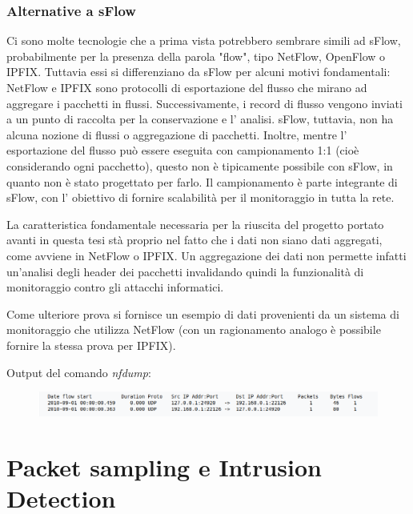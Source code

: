 \documentclass[12pt,a4paper,openright,twoside]{report}
\begin{document}
\subsubsection{Alternative a sFlow}

Ci sono molte tecnologie che a prima vista potrebbero sembrare simili ad sFlow,
probabilmente per la presenza della parola "flow", tipo NetFlow, OpenFlow o IPFIX.
Tuttavia essi si differenziano da sFlow per alcuni motivi fondamentali:
NetFlow e IPFIX sono protocolli di esportazione del flusso che mirano ad aggregare i pacchetti in flussi.
Successivamente, i record di flusso vengono inviati a un punto di raccolta per la
conservazione e l' analisi. \cite{S1} sFlow, tuttavia, non ha alcuna nozione di flussi o
aggregazione di pacchetti.
Inoltre, mentre l' esportazione del flusso pu\`o essere eseguita con campionamento 1:1
(cio\`e considerando ogni pacchetto), questo non \`e tipicamente possibile con sFlow,
in quanto non \`e stato progettato per farlo. Il campionamento \`e parte integrante di
sFlow, con l' obiettivo di fornire scalabilit\`a per il monitoraggio in tutta la rete. \cite{S2}

La caratteristica fondamentale necessaria per la riuscita del progetto portato avanti in questa tesi
st\`a proprio nel fatto che i dati non siano dati aggregati, come avviene
in NetFlow o IPFIX. Un aggregazione dei dati non permette infatti un'analisi degli header
dei pacchetti invalidando quindi la funzionalit\`a di monitoraggio contro gli
attacchi informatici.

Come ulteriore prova si fornisce un esempio di dati provenienti da un sistema
di monitoraggio che utilizza NetFlow (con un ragionamento analogo \`e possibile
fornire la stessa prova per IPFIX).

Output del comando {\it nfdump}:
\begin{figure}[h!]
  \begin{center}                          %
    \includegraphics[width=\linewidth]{images/netflow.png}
    \caption{}
    \label{}
  \end{center}
\end{figure}

\newpage

\section{Packet sampling e Intrusion Detection}
\end{document}
